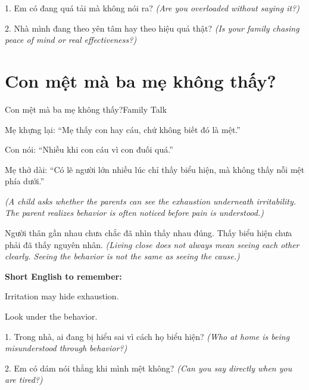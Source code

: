 \begin{tuhocnhanh}
1. Em có đang quá tải mà không nói ra? \textit{(Are you overloaded without saying it?)}

2. Nhà mình đang theo yên tâm hay theo hiệu quả thật? \textit{(Is your family chasing peace of mind or real effectiveness?)}
\end{tuhocnhanh}
\ngancach

\section{Con mệt mà ba mẹ không thấy?}
\begin{truyen}{Con mệt mà ba mẹ không thấy?}{Family Talk}

Mẹ khựng lại: ``Mẹ thấy con hay cáu, chứ không biết đó là mệt.''

Con nói: ``Nhiều khi con cáu vì con đuối quá.''

Mẹ thở dài: ``Có lẽ người lớn nhiều lúc chỉ thấy biểu hiện, mà không thấy nỗi mệt phía dưới.''

\textit{(A child asks whether the parents can see the exhaustion underneath irritability. The parent realizes behavior is often noticed before pain is understood.)}
\end{truyen}

\begin{baihoc}
Người thân gần nhau chưa chắc đã nhìn thấy nhau đúng. Thấy biểu hiện chưa phải đã thấy nguyên nhân.
\textit{(Living close does not always mean seeing each other clearly. Seeing the behavior is not the same as seeing the cause.)}
\end{baihoc}

\begin{ghinhoanh}
\textbf{Short English to remember:}

Irritation may hide exhaustion.

Look under the behavior.
\end{ghinhoanh}

\begin{tuhocnhanh}
1. Trong nhà, ai đang bị hiểu sai vì cách họ biểu hiện? \textit{(Who at home is being misunderstood through behavior?)}

2. Em có dám nói thẳng khi mình mệt không? \textit{(Can you say directly when you are tired?)}
\end{tuhocnhanh}
\ngancach

